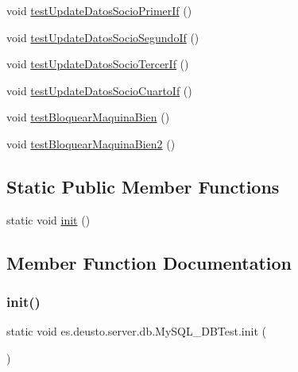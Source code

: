 \begin{DoxyCompactItemize}
\item 
void \mbox{\hyperlink{classes_1_1deusto_1_1server_1_1db_1_1_my_s_q_l___d_b_test_ae3f8506c7b83f95360a8bace7589059d}{test\+Update\+Datos\+Socio\+Primer\+If}} ()
\item 
void \mbox{\hyperlink{classes_1_1deusto_1_1server_1_1db_1_1_my_s_q_l___d_b_test_a948819160eb344fe2b2dcfe08a1f8e5d}{test\+Update\+Datos\+Socio\+Segundo\+If}} ()
\item 
void \mbox{\hyperlink{classes_1_1deusto_1_1server_1_1db_1_1_my_s_q_l___d_b_test_aaf87365f5dd52ed66fdb9b76a72662de}{test\+Update\+Datos\+Socio\+Tercer\+If}} ()
\item 
void \mbox{\hyperlink{classes_1_1deusto_1_1server_1_1db_1_1_my_s_q_l___d_b_test_a24cf8a3fd10f58d05e2782e914824d37}{test\+Update\+Datos\+Socio\+Cuarto\+If}} ()
\item 
void \mbox{\hyperlink{classes_1_1deusto_1_1server_1_1db_1_1_my_s_q_l___d_b_test_acb8cd14b947635ce54af870e06a05c19}{test\+Bloquear\+Maquina\+Bien}} ()
\item 
void \mbox{\hyperlink{classes_1_1deusto_1_1server_1_1db_1_1_my_s_q_l___d_b_test_ada39311c4a6d1284482eefb8110f8e50}{test\+Bloquear\+Maquina\+Bien2}} ()
\end{DoxyCompactItemize}
\subsection*{Static Public Member Functions}
\begin{DoxyCompactItemize}
\item 
static void \mbox{\hyperlink{classes_1_1deusto_1_1server_1_1db_1_1_my_s_q_l___d_b_test_a56738482f297c92914d00f0a4814651b}{init}} ()
\end{DoxyCompactItemize}


\subsection{Member Function Documentation}
\mbox{\label{classes_1_1deusto_1_1server_1_1db_1_1_my_s_q_l___d_b_test_a56738482f297c92914d00f0a4814651b}} 
\subsubsection{\texorpdfstring{init()}{init()}}
{\footnotesize\ttfamily static void es.\+deusto.\+server.\+db.\+My\+S\+Q\+L\+\_\+\+D\+B\+Test.\+init (\begin{DoxyParamCaption}{ }\end{DoxyParamCaption})\hspace{0.3cm}{\ttfamily [static]}}

